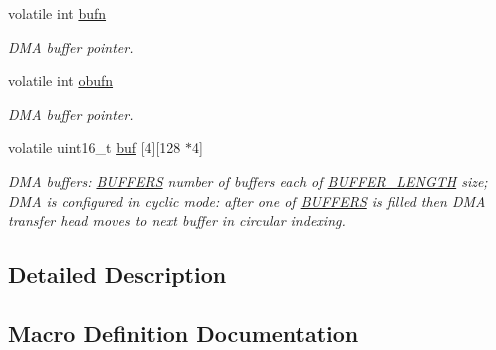 \begin{DoxyCompactItemize}
volatile int \mbox{\hyperlink{group___board__model__group_gad2658b77f345b15c03759c02d1ba0e81}{bufn}}
\begin{DoxyCompactList}\small\item\em D\+MA buffer pointer. \end{DoxyCompactList}\item 
\mbox{\label{group___board__model__group_gafef4d6ed48b3edc5f7a74defba82e7d8}} 
volatile int \mbox{\hyperlink{group___board__model__group_gafef4d6ed48b3edc5f7a74defba82e7d8}{obufn}}
\begin{DoxyCompactList}\small\item\em D\+MA buffer pointer. \end{DoxyCompactList}\item 
\mbox{\label{group___board__model__group_gabaadbcc3b48e8ec3798741a74a672046}} 
volatile uint16\+\_\+t \mbox{\hyperlink{group___board__model__group_gabaadbcc3b48e8ec3798741a74a672046}{buf}} \mbox{[}4\mbox{]}\mbox{[}128 $\ast$4\mbox{]}
\begin{DoxyCompactList}\small\item\em D\+MA buffers\+: \mbox{\hyperlink{group___board__model__group_gaabe0f927d44a09f458bd5fe5ab4e2f7f}{B\+U\+F\+F\+E\+RS}} number of buffers each of \mbox{\hyperlink{group___board__model__group_gaf7b7dc9a200cb1404c280bd500fd1551}{B\+U\+F\+F\+E\+R\+\_\+\+L\+E\+N\+G\+TH}} size; D\+MA is configured in cyclic mode\+: after one of \mbox{\hyperlink{group___board__model__group_gaabe0f927d44a09f458bd5fe5ab4e2f7f}{B\+U\+F\+F\+E\+RS}} is filled then D\+MA transfer head moves to next buffer in circular indexing. \end{DoxyCompactList}\end{DoxyCompactItemize}


\subsection{Detailed Description}


\subsection{Macro Definition Documentation}
\mbox{\label{group___board__model__group_gaabe0f927d44a09f458bd5fe5ab4e2f7f}} 
